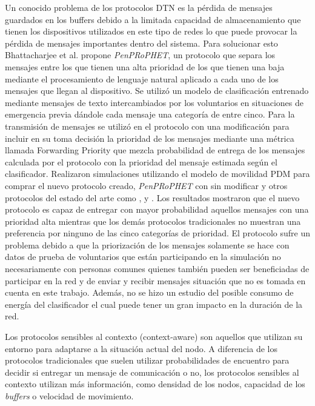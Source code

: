 Un conocido problema de los protocolos DTN es la pérdida de mensajes guardados
en los buffers debido a la limitada capacidad de almacenamiento que tienen los
dispositivos utilizados en este tipo de redes lo que puede provocar la pérdida
de mensajes importantes dentro del sistema. Para solucionar esto Bhattacharjee
et al.  \cite{Bhattacharjee2016}  propone \textit{PenPRoPHET}, un protocolo que
separa los mensajes entre los que tienen una alta prioridad de los que tienen
una baja mediante el procesamiento de lenguaje natural aplicado a cada uno de
los mensajes que llegan al dispositivo. Se utilizó un modelo de clasificación
entrenado mediante mensajes de texto intercambiados por los voluntarios en
situaciones de emergencia previa dándole cada mensaje una categoría de entre
cinco. Para la transmisión de mensajes se utilizó en el protocolo \prophet{} con
una modificación para incluir en su toma decisión la prioridad de los mensajes
mediante una métrica llamada Forwarding Priority que mezcla probabilidad de
entrega de los mensajes calculada por el protocolo con la prioridad del mensaje
estimada según el clasificador. Realizaron simulaciones utilizando el modelo
de movilidad PDM para comprar el nuevo protocolo creado, \textit{PenPRoPHET} con
\prophet{} sin modificar y otros protocolos del estado del arte como \maxprop,
\syw{} y \epidemic.  Los resultados mostraron que el nuevo protocolo es capaz de
entregar con mayor probabilidad aquellos mensajes con una prioridad alta
mientras que los demás protocolos tradicionales no muestran una preferencia por
ninguno de las cinco categorías de prioridad.  El protocolo sufre un problema
debido a que la priorización de los mensajes solamente se hace con datos de
prueba de voluntarios que están participando en la simulación no necesariamente
con personas comunes quienes también pueden ser beneficiadas de participar en la
red y de enviar y recibir mensajes situación que no es tomada en cuenta en este
trabajo. Además, no se hizo un estudio del posible consumo de energía del
clasificador el cual puede tener un gran impacto en la duración de la red.



Los protocolos sensibles al contexto (context-aware) son aquellos que utilizan
su entorno para adaptarse a la situación actual del nodo. A diferencia de los
protocolos tradicionales que suelen utilizar probabilidades de encuentro para
decidir si entregar un mensaje de comunicación o no, los protocolos sensibles
al contexto utilizan más información, como densidad de los nodos, capacidad de
los \textit{buffers} o velocidad de movimiento.

